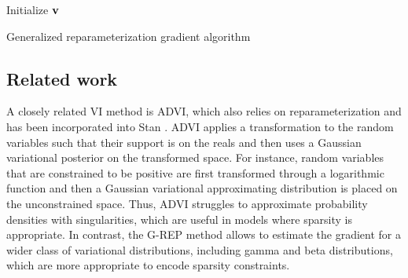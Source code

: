 \begin{algorithm}[t]
    \DontPrintSemicolon
    \SetAlgoLined
    Initialize $\mathbf{v}$\;
    \caption{Generalized reparameterization gradient algorithm\label{alg:g-rep}}
\end{algorithm}




\vspace*{-5pt}
\subsection{Related work}
\vspace*{-6pt}
A closely related \gls{VI} method is \gls{ADVI}, which also relies on reparameterization and has been incorporated into Stan \citep{Kucukelbir2015,Kucukelbir2016}. \gls{ADVI} applies a transformation to the random variables such that their support is on the reals and then uses a Gaussian variational posterior on the transformed space. For instance, random variables that are constrained to be positive are first transformed through a logarithmic function and then a Gaussian variational approximating distribution is placed on the unconstrained space. Thus, \gls{ADVI} struggles to approximate probability densities with singularities, which are useful in models where sparsity is appropriate. In contrast, the \gls{G-REP} method allows to estimate the gradient for a wider class of variational distributions, including gamma and beta distributions, which are more appropriate to encode sparsity constraints.



